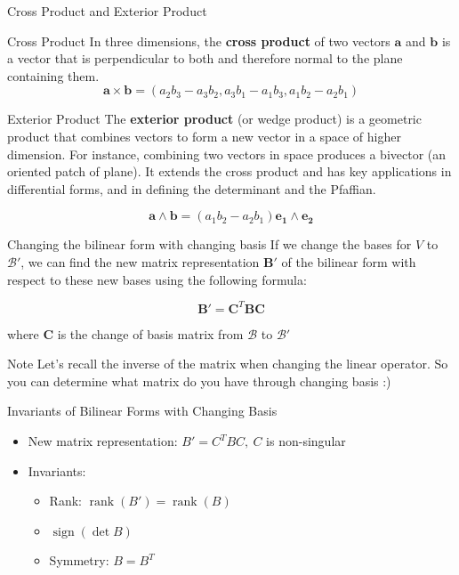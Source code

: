 \documentclass[fullscreen=true, bookmarks=true, hyperref={pdfencoding=unicode}]{beamer}
\begin{document}
\begin{frame}{Cross Product and Exterior Product}

  \pause
  \begin{block}{Cross Product}
  \small
  In three dimensions, the \textbf{cross product} of two vectors $\mathbf{a}$ 
  and $\mathbf{b}$ is a vector that is perpendicular 
  to both and therefore normal to the plane containing them.
  \[
  \mathbf{a} \times \mathbf{b} = \left( a_2b_3 - a_3b_2, a_3b_1 - a_1b_3, a_1b_2 - a_2b_1 \right)
  \]
  \end{block}
  
  \pause
  \begin{block}{Exterior Product}
  \small
  The \textbf{exterior product} (or wedge product) is a geometric product 
  that combines vectors to form a new vector in a space of higher dimension. 
  For instance, combining two vectors in space produces a 
  bivector (an oriented patch of plane). 
  It extends the cross product and has key applications 
  in differential forms, and in defining the determinant and the Pfaffian.
  
  \[
  \mathbf{a} \wedge \mathbf{b} = (a_1b_2 - a_2b_1) \mathbf{e_1} \wedge \mathbf{e_2}
  \]
  \end{block}
\end{frame}
  

\begin{frame}{Changing the bilinear form with changing basis}  
  If we change the bases for $V$ to $\mathcal{B}'$, 
  we can find the new matrix representation $\mathbf{B}'$ of the bilinear form 
  with respect to these new bases using the following formula:
  
  \[
  \mathbf{B}' = \mathbf{C}^{T} \mathbf{B} \mathbf{C}
  \]
  
  where $\mathbf{C}$ is the change of basis matrix from $\mathcal{B}$ to 
  $\mathcal{B}'$
  
  \pause
  \begin{block}{Note}
    Let's recall the inverse of the matrix when changing the linear operator. 
    So you can determine what matrix do you have through changing basis :)
  \end{block}
\end{frame}


\begin{frame}{Invariants of Bilinear Forms with Changing Basis}
  \begin{itemize}
    \item New matrix representation: $B' = C^T B C,\ C$ is non-singular
    \item Invariants:
      \begin{itemize}
        \pause \item Rank: $\operatorname{rank}(B') = \operatorname{rank}(B)$
        \pause \item $\operatorname{sign}(\det B)$
        \pause \item Symmetry: $B=B^T$
      \end{itemize}
  \end{itemize}
\end{frame}
\end{document}
